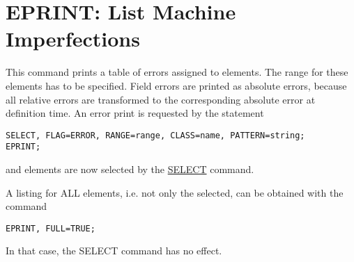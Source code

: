 
\section{EPRINT: List Machine Imperfections}  
\label{sec:eprint}
This command prints a table of errors assigned to elements. The range
for these elements has to be specified. Field errors are printed as
absolute errors, because all relative errors are transformed to the
corresponding absolute error at definition time. An error print is
requested by the statement  

\begin{verbatim}
SELECT, FLAG=ERROR, RANGE=range, CLASS=name, PATTERN=string;
EPRINT;
\end{verbatim}
and elements are now selected by the
\href{../Introduction/select.html}{SELECT} command.  


A listing for ALL elements, i.e. not only the selected, can be obtained
with the command  
\begin{verbatim}
EPRINT, FULL=TRUE;
\end{verbatim} 
In that case, the SELECT command has no effect.

